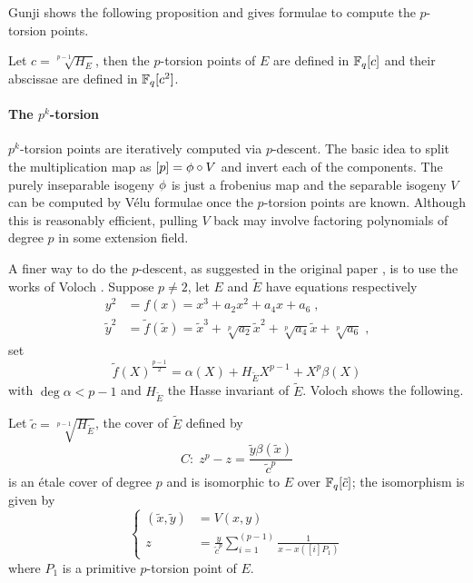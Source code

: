 Gunji shows the following proposition and gives formulae to compute
the $p$-torsion points.

\begin{proposition}
  \label{th:gunji}
  Let $c=\sqrt[p-1]{H_E}$, then the $p$-torsion points of $E$ are
  defined in $\mathbb{F}_q[c]$ and their abscissae are defined in $\mathbb{F}_q[c^2]$.
\end{proposition}


\paragraph{The $p^k$-torsion}
$p^k$-torsion points are iteratively computed via $p$-descent. The
basic idea to split the multiplication map as $[p] = \phi\circ V$
and invert each of the components. The purely inseparable isogeny
$\phi$ is just a frobenius map and the separable isogeny $V$ can
be computed by Vélu formulae once the $p$-torsion points are
known. Although this is reasonably efficient, pulling $V$ back may
involve factoring polynomials of degree $p$ in some extension field.

A finer way to do the $p$-descent, as suggested in the original paper
\cite{Cou96}, is to use the works of Voloch \cite{Vol90}. Suppose
$p\ne2$, let $E$ and $\widetilde{E}$ have equations respectively
\begin{align*}
  y^2&=f(x)=x^3+a_2x^2+a_4x+a_6 \;\text{,}\\
  \tilde{y}^2&=\tilde{f}(\tilde{x}) = \tilde{x}^3 +
  \sqrt[p]{a_2}\tilde{x}^2 + \sqrt[p]{a_4}\tilde{x} + \sqrt[p]{a_6}
  \;\text{,}
\end{align*}
set
 \begin{equation}
  \label{eq:voloch:cover}
  \tilde{f}(X)^{\frac{p-1}{2}} = \alpha(X) + H_{\widetilde{E}}X^{p-1} + X^p\beta(X)
\end{equation}
with $\deg \alpha < p-1$ and $H_{\widetilde{E}}$ the Hasse invariant
of $\widetilde{E}$. Voloch shows the following.

\begin{proposition}
  \label{th:voloch}
  Let $\tilde{c} = \sqrt[p-1]{H_{\widetilde{E}}}$, the cover of
  $\widetilde{E}$ defined by
  \begin{equation}
    \label{th:voloch:cover}
    C:\; z^p - z = \frac{\tilde{y}\beta(\tilde{x})}{\tilde{c}^p}
  \end{equation}
  is an étale cover of degree $p$ and is isomorphic to $E$ over
  $\mathbb{F}_q[\tilde{c}]$; the isomorphism is given by
  \begin{equation}
    \label{th:voloch:isom}
    \left\{
      \begin{aligned}
        (\tilde{x}, \tilde{y}) &= V(x, y)\\
        z &= \frac{y}{\tilde{c}^p}\sum_{i=1}^{(p-1)}\frac{1}{x - x([i]P_1)}
      \end{aligned}
    \right.
  \end{equation}
  where $P_1$ is a primitive $p$-torsion point of $E$.
\end{proposition}

